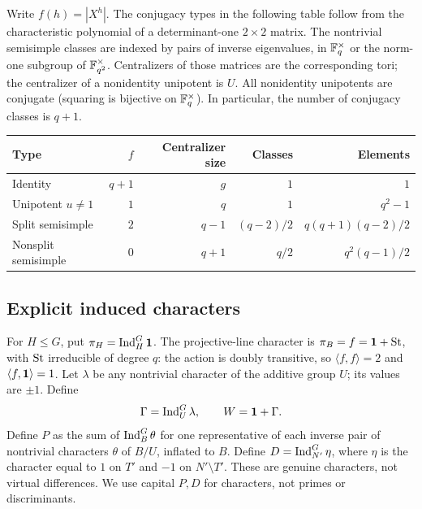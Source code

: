 \documentclass[11pt]{article}
\theoremstyle{remark}\newtheorem{remark}[theorem]{Remark}
\begin{document}
Write $f(h)=|X^h|$. The conjugacy types in the following table follow from the characteristic polynomial of a determinant-one $2\times2$ matrix. The nontrivial semisimple classes are indexed by pairs of inverse eigenvalues, in $\mathbb F_q^\times$ or the norm-one subgroup of $\mathbb F_{q^2}^\times$. Centralizers of those matrices are the corresponding tori; the centralizer of a nonidentity unipotent is $U$. All nonidentity unipotents are conjugate (squaring is bijective on $\mathbb F_q^\times$). In particular, the number of conjugacy classes is $q+1$.
\begin{center}\small
\begin{tabular}{@{}lrrrr@{}}\toprule
Type & $f$ & Centralizer size & Classes & Elements\\\midrule
Identity & $q+1$ & $g$ & $1$ & $1$\\
Unipotent $u\ne1$ & $1$ & $q$ & $1$ & $q^2-1$\\
Split semisimple & $2$ & $q-1$ & $(q-2)/2$ & $q(q+1)(q-2)/2$\\
Nonsplit semisimple & $0$ & $q+1$ & $q/2$ & $q^2(q-1)/2$\\\bottomrule
\end{tabular}
\end{center}

\subsection{Explicit induced characters}
For $H\le G$, put $\pi_H=\operatorname{Ind}_H^G\mathbf 1$. The projective-line character is $\pi_B=f=\mathbf 1+\mathrm{St}$, with $\mathrm{St}$ irreducible of degree $q$: the action is doubly transitive, so $\langle f,f\rangle=2$ and $\langle f,\mathbf 1\rangle=1$. Let $\lambda$ be any nontrivial character of the additive group $U$; its values are $\pm1$. Define
\[
 \Gamma=\operatorname{Ind}_U^G\lambda,\qquad W=\mathbf 1+\Gamma.
\]
Define $P$ as the sum of $\operatorname{Ind}_B^G\theta$ for one representative of each inverse pair of nontrivial characters $\theta$ of $B/U$, inflated to $B$. Define $D=\operatorname{Ind}_{N'}^G\eta$, where $\eta$ is the character equal to $1$ on $T'$ and $-1$ on $N'\setminus T'$. These are genuine characters, not virtual differences. We use capital $P,D$ for characters, not primes or discriminants.
\end{document}
